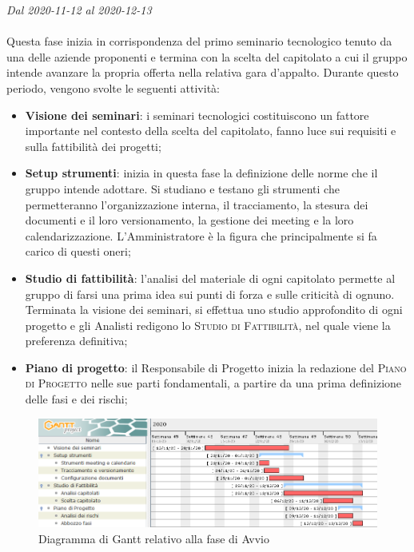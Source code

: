 \textit{Dal 2020-11-12 al 2020-12-13}
\\\\
Questa fase inizia in corrispondenza del primo seminario tecnologico tenuto da una delle aziende proponenti e termina con la scelta del capitolato a cui il gruppo intende avanzare la propria offerta nella relativa gara d'appalto.
Durante questo periodo, vengono svolte le seguenti attività:
\begin{itemize}
	\item \textbf{Visione dei seminari}: i seminari tecnologici costituiscono un fattore importante nel contesto della scelta del capitolato, fanno luce sui requisiti e sulla fattibilità dei progetti;
	\item \textbf{Setup strumenti}: inizia in questa fase la definizione delle norme che il gruppo intende adottare. Si studiano e testano gli strumenti che permetteranno l'organizzazione interna, il tracciamento, la stesura dei documenti e il loro versionamento, la gestione dei meeting e la loro calendarizzazione. L'Amministratore è la figura che principalmente si fa carico di questi oneri;
	\item \textbf{Studio di fattibilità}: l'analisi del materiale di ogni capitolato permette al gruppo di farsi una prima idea sui punti di forza e sulle criticità di ognuno. Terminata la visione dei seminari, si effettua uno studio approfondito di ogni progetto e gli Analisti redigono lo \textsc{Studio di Fattibilità}, nel quale viene la preferenza definitiva;
	\item \textbf{Piano di progetto}: il Responsabile di Progetto inizia la redazione del \textsc{Piano di Progetto} nelle sue parti fondamentali, a partire da una prima definizione delle fasi e dei rischi;
\end{itemize}  


\begin{figure}[H]
	\centering
	\includegraphics[scale=0.62]{res/images/01_gantt_avvio.png}
	\caption{Diagramma di Gantt relativo alla fase di Avvio}
\end{figure}




